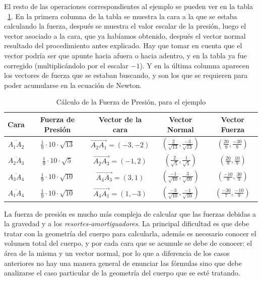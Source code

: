 El resto de las operaciones correspondientes al ejemplo se pueden ver en la tabla ~\ref{ejemplo:presion}. En la primera columna de la tabla se muestra la cara a la que se estaba calculando la fuerza, después se muestra el valor escalar de la presión, luego el vector asociado a la cara, que ya habíamos obtenido, después el vector normal resultado del procedimiento antes explicado. Hay que tomar en cuenta que el vector podría ser que apunte hacia afuera o hacia adentro, y en la tabla ya fue corregido (multiplicándolo por el escalar $-1$). Y en la última columna aparecen los vectores de fuerza que se estaban buscando, y son los que se requieren para poder acumularse en la ecuación de Newton.

\begin{table}
\caption[Ejemplo sobre cómo calcular la fuerza de presión]{Cálculo de la Fuerza de Presión, para el ejemplo}
\label{ejemplo:presion}
\begin{center}
\begin{tabular} {|c|c|c|c|c|} \hline
Cara & Fuerza de Presión &  Vector de la cara & Vector Normal & Vector Fuerza \\ \hline
$\overline{A_1A_2}$ & $\frac{1}{9} \cdot 10 \cdot \sqrt{13} $ & $\overrightarrow{A_2A_1} = (-3,-2)$ & $(\frac{2}{\sqrt{13}}, \frac{-3}{\sqrt{13}})$ & $(\frac{20}{9}, \frac{-30}{9})$ \\
$\overline{A_2A_3}$ & $\frac{1}{9} \cdot 10 \cdot \sqrt{5} $ & $\overrightarrow{A_2A_3} = (-1,2)$ & $(\frac{2}{\sqrt{5}}, \frac{1}{\sqrt{5}})$ & $(\frac{20}{9}, \frac{10}{9})$ \\
$\overline{A_3A_4}$ & $\frac{1}{9} \cdot 10 \cdot \sqrt{10} $ & $\overrightarrow{A_4A_3} = (3,1)$ & $(\frac{-1}{\sqrt{10}}, \frac{3}{\sqrt{10}})$ & $(\frac{-10}{9}, \frac{30}{9})$ \\
$\overline{A_1A_4}$ & $\frac{1}{9} \cdot 10 \cdot \sqrt{10} $ & $\overrightarrow{A_4A_1} = (1,-3)$ & $(\frac{-3}{\sqrt{10}}, \frac{-1}{\sqrt{10}})$ & $(\frac{-30}{7}, \frac{-10}{9})$ \\ \hline
\end{tabular}
\end{center}
\end{table}

La fuerza de presión es mucho más compleja de calcular que las fuerzas debidas a la gravedad y a los \emph{resortes-amortiguadores}. La principal dificultad es que debe tratar con la geometría del cuerpo para calcularla, además es necesario conocer el volumen total del cuerpo, y por cada cara que se acumule se debe de conocer: el área de la misma y un vector normal, por lo que a diferencia de los casos anteriores no hay una manera general de enunciar las fórmulas sino que debe analizarse el caso particular de la geometría del cuerpo que se esté tratando.


